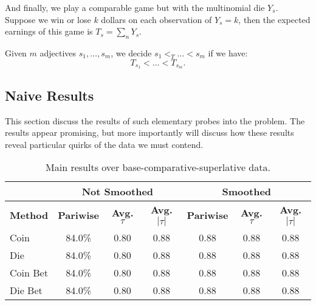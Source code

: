 And finally, we play a comparable game but with the multinomial die $Y_s$. Suppose we win or lose $k$ dollars on each observation of $Y_s = k$, then the expected earnings of this game is $T_s = \sum_{n} Y_s$.

\begin{definition}
Given $m$ adjectives $s_1, \ldots, s_m$, we decide $s_1 <_{T} \ldots < s_m$ if we have:
	\[
		T_{s_1} < \ldots < T_{s_m}.
	\]
\end{definition}


\subsection{Naive Results}

This section discuss the results of such elementary probes into the problem. The results appear promising, but more importantly will discuss how these results reveal particular quirks of the data we must contend. 

\begin{table}
	\small
	\centering
	\begin{tabular}{|l|c|c|c|c|c|c|}
		\hline 
		& \multicolumn{3}{c}{Not Smoothed} & \multicolumn{3}{c}{Smoothed} \\
		\hline 
		\bf Method & \bf Pariwise & \bf Avg. $\tau$ & \bf Avg. $|\tau|$ & 
		\bf Pariwise & \bf Avg. $\tau$ & \bf Avg. $|\tau|$ \\ 
		\hline
		Coin      & 84.0\% & 0.80 & 0.88 & 0.88 & 0.88 & 0.88 \\
		Die       & 84.0\% & 0.80 & 0.88 & 0.88 & 0.88 & 0.88 \\
		Coin Bet  & 84.0\% & 0.80 & 0.88 & 0.88 & 0.88 & 0.88 \\
		Die Bet   & 84.0\% & 0.80 & 0.88 & 0.88 & 0.88 & 0.88 \\
		\hline
	\end{tabular}
	\caption{\label{font-table} Main results over base-comparative-superlative data.}
\end{table}














